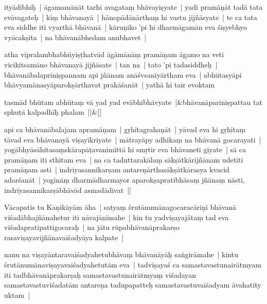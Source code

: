 \documentclass[article,12pt,a4paper]{memoir}%
\newcounter{parCount}
\begin{document}
	  \pstart \leavevmode%
	ityādibhiḥ | āgamamānāt tarhi avagataṃ bhāvayiṣyate | yadi pramāṇāt tadā tata evāvagateḥ | kiṃ bhāvanayā | hānopādānārthaṃ hi vastu jijñāsyate | te ca tata eva siddhe iti vyarthā bhāvanā | kāruṇiko 'pi hi dharmāgamān eva śiṣyebhyo vyācakṣīta | na bhāvanābhedam anubhavet | 
	{}
	\pend%
      

	  \pstart \leavevmode%
	\label{thakur75-10.3}atha vipralambhabhūyiṣṭhatvād āgāmānāṃ pramāṇam āgamo na veti vicikitsamāno bhāvanayā jijñāsate | tan na | tato 'pi tadasiddheḥ | bhāvanābalapriniṣpannam api jñānam anāśvsanīyārtham eva | abhūtasyāpi bhāvyamānasyāparokṣārthavat prakāśanāt | yathā hi tair evoktam 
	{}
	\pend%
      
	    
	    \stanza[\smallbreak]
	  tasmād bhūtam abhūtaṃ vā yad yad evābhibhāvyate |&bhāvanāpariniṣpattau tat sphuṭā kalpadhīḥ phalam ||\&[\smallbreak]
	  
	  
	  

	  \pstart \leavevmode%
	api ca bhāvanābalajam apramāṇam | gṛhītagrahaṇāt | yāvad eva hi gṛhītaṃ tāvad eva bhāvanayā viṣayīkriyate | mātrayāpy adhikaṃ na bhāvanā gocarayati | yogābhyāsāhitasaṃskārapāṭavanimittā hi smṛtir eva bhāvaneti gīyate | sā ca pramāṇam iti sthitam eva | na ca taduttarakālaṃ sākṣātkārijñānam udetīti pramāṇam asti | indriyasannikarṣam antareṇārthasākṣātkārasya kvacid adarśanāt | yogināṃ dharmādharmayor aparokṣapratibhāsaṃ jñānaṃ nāsti, indriyasannikarṣābhāvād asmadādivat || 
	{}
	\pend%
      

	  \pstart \leavevmode%
	\label{thakur75-10.14}Vācapatis tu Kaṇikāyām āha | satyaṃ śrutānumānagocaracāriṇī bhāvanā viśadābhajñānahetur iti nāvajānīmahe | kin tu yadviṣayajātaṃ tad eva viśadapratipattigocaraḥ | na jātu rūpabhāvanāprakarṣo rasaviṣayavijñānavaiśadyāya kalpate | 
	{}
	\pend%
      

	  \pstart \leavevmode%
	\label{thakur75-10.17}nanu na viṣayāntaravaiśadyahetubhāvaṃ bhāvanāyāḥ saṅgirāmahe | kintu śrutānumānaviṣayavaiśadyahetutām eva | tadviṣayaś ca samastavastunairātmyam iti tadbhāvanāprakarṣaḥ samastavastunairātmyaṃ viśadayan samastavastuviśadatām antareṇa tadupapatteḥ samastavastuvaiśadyam āvahatīty uktam | 
	{}
	\pend%
      
\end{document}
